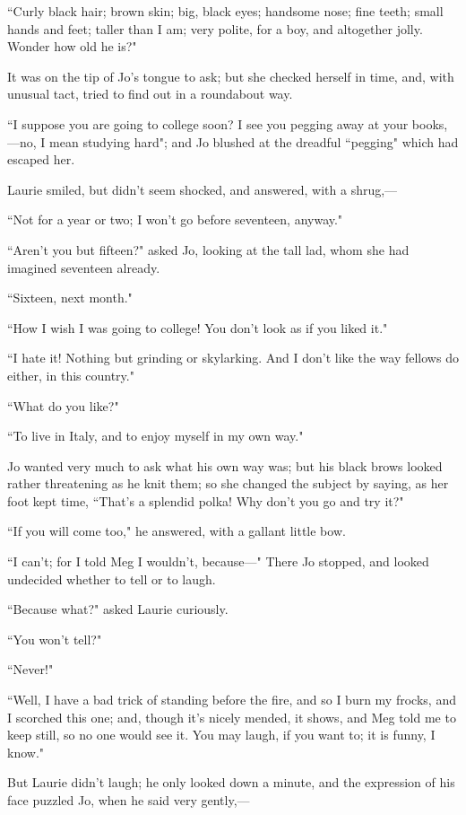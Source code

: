 ``Curly black hair; brown skin; big, black eyes; handsome nose; fine
teeth; small hands and feet; taller than I am; very polite, for a boy,
and altogether jolly. Wonder how old he is?"

It was on the tip of Jo's tongue to ask; but she checked
herself in time, and, with unusual tact, tried to find out in a
roundabout way.

``I suppose you are going to college soon? I see you pegging away at your
books,---no, I mean studying hard"; and Jo blushed at the dreadful
``pegging" which had escaped her.

Laurie smiled, but didn't seem shocked, and answered,
with a shrug,---

``Not for a year or two; I won't go before seventeen,
anyway."

``Aren't you but fifteen?" asked Jo, looking at the tall
lad, whom she had imagined seventeen already.

``Sixteen, next month."

``How I wish I was going to college! You don't look as if
you liked it."

``I hate it! Nothing but grinding or skylarking. And I
don't like the way fellows do either, in this country."

``What do you like?"

``To live in Italy, and to enjoy myself in my own way."

Jo wanted very much to ask what his own way was; but his black brows
looked rather threatening as he knit them; so she changed the subject by
saying, as her foot kept time, ``That's a splendid polka!
Why don't you go and try it?"

``If you will come too," he answered, with a gallant little bow.

``I can't; for I told Meg I wouldn't,
because---" There Jo stopped, and looked undecided whether to tell or to
laugh.

``Because what?" asked Laurie curiously.

``You won't tell?"

``Never!"

``Well, I have a bad trick of standing before the fire, and so I burn my
frocks, and I scorched this one; and, though it's nicely
mended, it shows, and Meg told me to keep still, so no one would see it.
You may laugh, if you want to; it is funny, I know."

But Laurie didn't laugh; he only looked down a minute,
and the expression of his face puzzled Jo, when he said very gently,---

